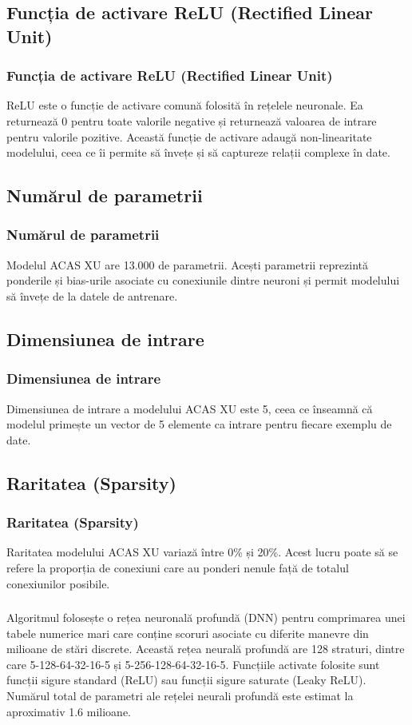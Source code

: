 \documentclass{beamer}
\begin{document}
\subsection{Funcția de activare ReLU (Rectified Linear Unit)}
\begin{frame}
  \frametitle{Funcția de activare ReLU (Rectified Linear Unit)}

  ReLU este o funcție de activare comună folosită în rețelele neuronale. Ea returnează 0 pentru toate valorile negative și returnează valoarea de intrare pentru valorile pozitive.
  Această funcție de activare adaugă non-linearitate modelului, ceea ce îi permite să învețe și să captureze relații complexe în date. \cite{deepai-relu} \cite{arxiv-1803.08375}
\end{frame}

\subsection{Numărul de parametrii}
\begin{frame}
  \frametitle{Numărul de parametrii}

  Modelul ACAS XU are 13.000 de parametrii. Acești parametrii reprezintă ponderile și bias-urile asociate cu conexiunile dintre neuroni și permit modelului să învețe de la datele de antrenare. \cite{ieee2019}
\end{frame}

\subsection{Dimensiunea de intrare}
\begin{frame}
  \frametitle{Dimensiunea de intrare}

  Dimensiunea de intrare a modelului ACAS XU este 5, ceea ce înseamnă că modelul primește un vector de 5 elemente ca intrare pentru fiecare exemplu de date. \cite{nasa}
\end{frame}

\subsection{Raritatea (Sparsity)}
\begin{frame}
  \frametitle{Raritatea (Sparsity)}

  Raritatea modelului ACAS XU variază între 0\% și 20\%. Acest lucru poate să se refere la proporția de conexiuni care au ponderi nenule față de totalul conexiunilor posibile.
\end{frame}
\begin{frame}
  \frametitle{}
Algoritmul folosește o rețea neuronală profundă (DNN) pentru comprimarea unei tabele numerice mari care conține scoruri asociate cu diferite manevre din milioane de stări discrete. Această rețea neurală profundă are 128 straturi, dintre care 5-128-64-32-16-5 și 5-256-128-64-32-16-5. Funcțiile activate folosite sunt funcții sigure standard (ReLU) sau funcții sigure saturate (Leaky ReLU). Numărul total de parametri ale rețelei neurali profundă este estimat la aproximativ 1.6 milioane. \cite{nasa2018} \cite{arxiv2018}
\end{frame}
\end{document}
